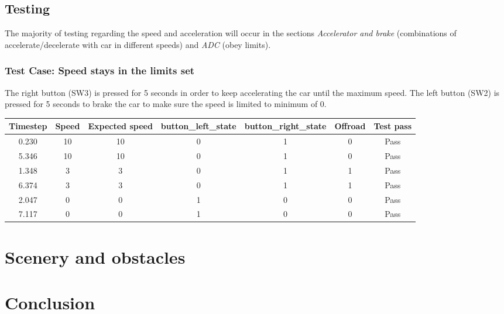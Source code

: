 \documentclass{article}
\begin{document}
\subsection*{Testing}
The majority of testing regarding the speed and acceleration will occur in the sections \emph{Accelerator and brake} (combinations of accelerate/decelerate with car in different speeds) and \emph{ADC} (obey limits). 
\subsubsection*{Test Case: Speed stays in the limits set}
The right button (SW3) is pressed for 5 seconds in order to keep accelerating the car until the maximum speed. The left button (SW2) is pressed for 5 seconds to brake the car to make sure the speed is limited to minimum of 0.
\begin{center}
\begin{tabular}{ c c c c c c c }
Timestep	& Speed	& Expected speed	&  button\_left\_state	& button\_right\_state	& Offroad	& Test pass	\\ \hline
0.230		& 10		& 10			& 0				& 1				& 0		& Pass	\\
5.346		& 10		& 10			& 0				& 1				& 0		& Pass	\\
1.348		& 3		& 3			& 0				& 1				& 1		& Pass	\\
6.374		& 3		& 3			& 0				& 1				& 1		& Pass	\\
2.047 		& 0		& 0			& 1 				& 0 				& 0  		& Pass	\\ 
7.117		& 0		& 0			& 1				& 0				& 0		& Pass	\\ \hline
\end{tabular}
\end{center}

\clearpage

\section{Scenery and obstacles}


\clearpage

\section{Conclusion}
\end{document}

